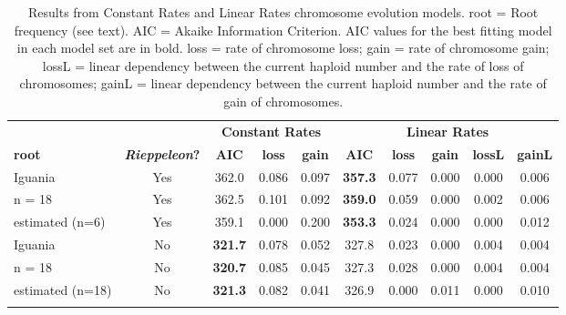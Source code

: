 \begin{longtable}{lccccccccc}

\caption{Results from Constant Rates and Linear Rates chromosome evolution models. root = Root frequency (see text). AIC = Akaike Information Criterion. AIC values for the best fitting model in each model set are in bold. loss = rate of chromosome loss; gain = rate of chromosome gain; lossL = linear dependency between the current haploid number and the rate of loss of chromosomes; gainL = linear dependency between the current haploid number and the rate of gain of chromosomes.
}\\ 
  
\hline
 &  & \multicolumn{3}{c}{\textbf{Constant Rates}} & \multicolumn{5}{c}{\textbf{Linear Rates}} \\
\textbf{root} & \textbf{\textit{Rieppeleon}?} & 
\textbf{AIC} & \textbf{loss} & \textbf{gain} & 
\textbf{AIC} & \textbf{loss} & \textbf{gain} & \textbf{lossL} & \textbf{gainL} \\
\hline
Iguania &
Yes &
362.0 &
0.086 &
0.097 &
\textbf{357.3} &
0.077 &
0.000 &
0.000 &
0.006\\
n = 18 &
Yes &
362.5 &
0.101 &
0.092 &
\textbf{359.0} &
0.059 &
0.000 &
0.002 &
0.006\\
estimated (n=6) &
Yes &
359.1 &
0.000 &
0.200 &
\textbf{353.3} &
0.024 &
0.000 &
0.000 &
0.012\\
Iguania &
No &
\textbf{321.7} &
0.078 &
0.052 &
327.8 &
0.023 &
0.000 &
0.004 &
0.004 \\
n = 18  &
No &
\textbf{320.7} &
0.085 &
0.045 &
327.3 &
0.028 &
0.000 &
0.004 &
0.004\\
estimated (n=18) &
No &
\textbf{321.3} &
0.082 &
0.041 &
326.9 &
0.000 &
0.011 &
0.000 &
0.010\\
\hline

\label{table-models}
\end{longtable}

















